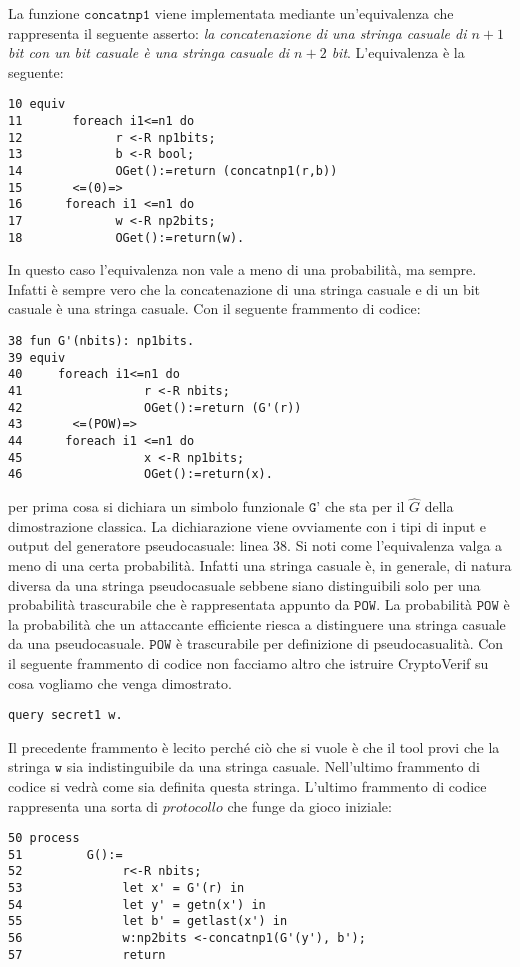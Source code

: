 \documentclass[a4paper,openright,twoside,12pt]{report}
\begin{document}
La funzione $\texttt{concatnp1}$ viene implementata mediante un'equivalenza che rappresenta il seguente asserto:
\emph{la concatenazione di una stringa casuale di $n+1$ bit con un bit casuale \`e una stringa casuale di
$n+2$ bit}. L'equivalenza \`e la seguente:
\begin{verbatim}
10 equiv
11       foreach i1<=n1 do
12             r <-R np1bits;
13             b <-R bool;
14             OGet():=return (concatnp1(r,b))
15       <=(0)=>
16      foreach i1 <=n1 do
17             w <-R np2bits;
18             OGet():=return(w).
\end{verbatim} 
In questo caso l'equivalenza non vale a meno di una probabilit\`a, ma sempre. Infatti \`e sempre vero che la concatenazione di una stringa casuale e di un bit casuale \`e una stringa casuale.
Con il seguente frammento di codice:
\begin{verbatim}
38 fun G'(nbits): np1bits.
39 equiv
40     foreach i1<=n1 do
41                 r <-R nbits;
42                 OGet():=return (G'(r))
43       <=(POW)=> 
44      foreach i1 <=n1 do
45                 x <-R np1bits;
46                 OGet():=return(x).
\end{verbatim}
per prima cosa si dichiara un simbolo funzionale $\texttt{G'}$ che sta per il $\hat{G}$ della dimostrazione classica. La dichiarazione viene ovviamente con i tipi di input e output del generatore pseudocasuale: linea 38.
Si noti come l'equivalenza valga a meno di una certa probabilit\`a. Infatti una stringa casuale \`e, in generale, di natura diversa da una stringa pseudocasuale sebbene siano distinguibili solo per una probabilit\`a trascurabile
che \`e rappresentata appunto da $\texttt{POW}$. La probabilit\`a $\texttt{POW}$ \`e la probabilit\`a che un attaccante efficiente 
riesca a distinguere una stringa casuale da una pseudocasuale. $\texttt{POW}$ \`e trascurabile per definizione di pseudocasualit\`a.
Con il seguente frammento di codice non facciamo altro che istruire CryptoVerif su cosa vogliamo che venga dimostrato.
\begin{verbatim}
query secret1 w.
\end{verbatim}
Il precedente frammento \`e lecito perch\'e ci\`o che si vuole \`e che il tool provi che la stringa $\texttt{w}$ sia indistinguibile da una stringa casuale. Nell'ultimo frammento di codice si vedr\`a come sia definita questa stringa.
L'ultimo frammento di codice rappresenta una sorta di $protocollo$ che funge da gioco iniziale:
\begin{verbatim}
50 process
51         G():=
52              r<-R nbits;
53              let x' = G'(r) in
54              let y' = getn(x') in
55              let b' = getlast(x') in
56              w:np2bits <-concatnp1(G'(y'), b');
57              return
\end{verbatim}
\end{document}
